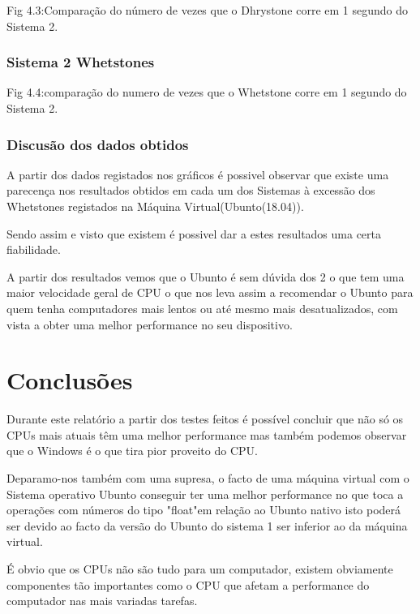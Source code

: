 \documentclass{report}
\begin{document}
Fig 4.3:Comparação do número de vezes que o Dhrystone corre em 1 segundo do Sistema 2.


\subsection{Sistema 2 Whetstones}

Fig 4.4:comparação do numero de vezes que o Whetstone corre em 1 segundo do Sistema 2.
\subsection{Discusão dos dados obtidos}
A partir dos dados registados nos gráficos é possivel observar que existe uma parecença nos resultados obtidos em cada um dos Sistemas à excessão dos Whetstones registados na Máquina Virtual(Ubunto(18.04)).

Sendo assim e visto que existem é possivel dar a estes resultados uma certa fiabilidade.

A partir dos resultados vemos que o Ubunto é sem dúvida dos 2 o que tem uma maior velocidade geral de CPU o que nos leva assim a recomendar o Ubunto para quem tenha computadores mais lentos ou até mesmo mais desatualizados, com vista a obter uma melhor performance no seu dispositivo.
\chapter{Conclusões}
\label{chap.conclusao}
Durante este relatório a partir dos testes feitos é possível concluir que não só os CPUs mais atuais têm uma melhor performance mas também podemos observar que o Windows é o que tira pior proveito do CPU.

Deparamo-nos também com uma supresa, o facto de uma máquina virtual com o Sistema operativo Ubunto conseguir ter uma melhor performance no que toca a operações com números do tipo "float"em relação ao Ubunto nativo isto poderá ser devido ao facto da versão do Ubunto do sistema 1 ser inferior ao da máquina virtual.

É obvio que os CPUs não são tudo para um computador, existem obviamente componentes tão importantes como o CPU que afetam a performance do computador nas mais variadas tarefas.
\end{document}
